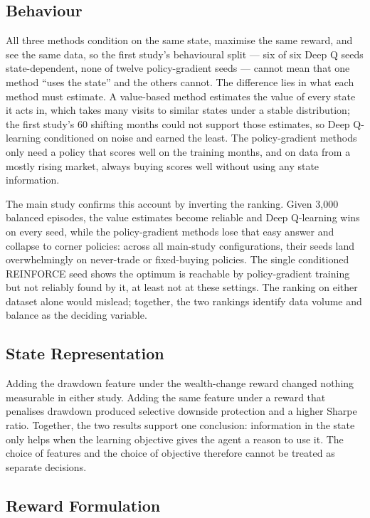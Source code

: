 \subsection{Behaviour}

All three methods condition on the same state, maximise the same reward,
and see the same data, so the first study's behavioural split --- six of six
Deep Q seeds state-dependent, none of twelve policy-gradient seeds ---
cannot mean that one method ``uses the state'' and the others cannot.
The difference lies in what each method must estimate. A value-based
method estimates the value of every state it acts in, which takes many
visits to similar states under a stable distribution; the first study's 60
shifting months could not support those estimates, so Deep Q-learning
conditioned on noise and earned the least. The policy-gradient methods
only need a policy that scores well on the training months, and on data
from a mostly rising market, always buying scores well without using any
state information.

The main study confirms this account by inverting the ranking. Given
3,000 balanced episodes, the value estimates become reliable and Deep
Q-learning wins on every seed, while the policy-gradient methods lose
that easy answer and collapse to corner policies: across all main-study
configurations, their seeds land overwhelmingly on never-trade or
fixed-buying policies. The single conditioned REINFORCE seed shows the
optimum is reachable by policy-gradient training but not reliably found
by it, at least not at these settings. The ranking on either dataset
alone would mislead; together, the two rankings identify data volume and
balance as the deciding variable.

\subsection{State Representation}

Adding the drawdown feature under the wealth-change reward changed
nothing measurable in either study. Adding the same feature under a
reward that penalises drawdown produced selective downside protection
and a higher Sharpe ratio. Together, the two results support one
conclusion: information in the state only helps when the learning
objective gives the agent a reason to use it. The choice of features and
the choice of objective therefore cannot be treated as separate
decisions.

\subsection{Reward Formulation}

